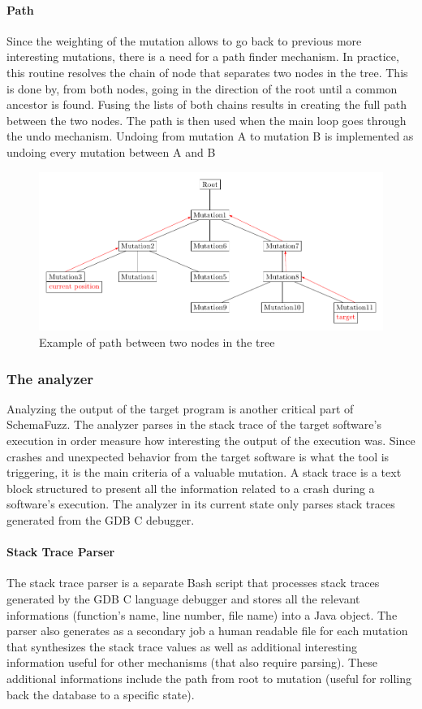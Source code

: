 \documentclass{article}
\begin{document}
\begin{empfile}
				\paragraph{Path} 
Since the weighting of the mutation allows to go back to previous more interesting mutations, 
there is a need for a path finder mechanism. In practice, this routine resolves the chain of node that separates two nodes in the tree. This is done by, from both nodes, going in the direction of the root until a common ancestor is found. Fusing the lists of both chains results in creating the full path between the two nodes. The path is then used when the main loop goes through the undo mechanism. Undoing from mutation A to mutation B is implemented as undoing every mutation between A and B

\bigskip

\begin{figure}[h!] 
\centering
\includegraphics[width=\textwidth]{CommonAncestorDiagram.pdf}
\caption{Example of path between two nodes in the tree}
\end{figure}

\bigskip
			\subsubsection{The analyzer}
Analyzing the output of the target program is another critical part of SchemaFuzz. The analyzer parses in the stack trace of the target software's execution in order measure how interesting the output of the execution was. Since crashes and unexpected behavior from the target software is what the tool is triggering, it is the main criteria of a valuable mutation. A stack trace is a text block structured to present all the information related to a crash during a software's execution. The analyzer in its current state only parses stack traces generated from the GDB C debugger.  
				\paragraph{Stack Trace Parser}
The stack trace parser is a separate Bash script that processes stack traces generated by the GDB C language debugger and stores all the relevant informations (function's name, line number, file name) into a Java object. The parser also generates as a secondary job a human readable file for each mutation that synthesizes the stack trace values as well as additional interesting information useful for other mechanisms (that also require parsing). These additional informations include the path from root to mutation (useful for rolling back the database to a specific state).

\end{empfile}
\end{document}
